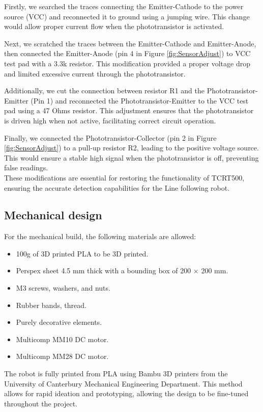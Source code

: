 Firstly, we searched the traces connecting the Emitter-Cathode to the power source (VCC) and reconnected it to ground using a jumping wire. This change would allow proper current flow when the phototransistor is activated. 

Next, we scratched the traces between the Emitter-Cathode and Emitter-Anode, then connected the Emitter-Anode (pin 4 in Figure \ref{fig:SensorAdjust}) to VCC test pad with a 3.3k resistor. This modification provided a proper voltage drop and limited excessive current through the phototransistor. 

Additionally, we cut the connection between resistor R1 and the Phototransistor-Emitter (Pin 1) and reconnected the Phototransistor-Emitter to the VCC test pad using a 47 Ohms resistor. This adjustment ensures that the phototransistor is driven high when not active, facilitating correct circuit operation.  

Finally, we connected the Phototransistor-Collector (pin 2 in Figure \ref{fig:SensorAdjust}) to a pull-up resistor R2, leading to the positive voltage source. This would ensure a stable high signal when the phototransistor is off, preventing false readings.  
\\

These modifications are essential for restoring the functionality of TCRT500, ensuring the accurate detection capabilities for the Line following robot. 

\subsection{Mechanical design}
For the mechanical build, the following materials are allowed: 

\begin{itemize}  
    \item 100g of 3D printed PLA to be 3D printed.   
    \item Perspex sheet 4.5 mm thick with a bounding box of 200 × 200 mm.   
    \item M3 screws, washers, and nuts. 
    \item Rubber bands, thread. 
    \item Purely decorative elements. 
    \item Multicomp MM10 DC motor.
    \item Multicomp MM28 DC motor.
\end{itemize}  
The robot is fully printed from PLA using Bambu 3D printers from the University of Canterbury Mechanical Engineering Department. This method allows for rapid ideation and prototyping, allowing the design to be fine-tuned throughout the project.  

